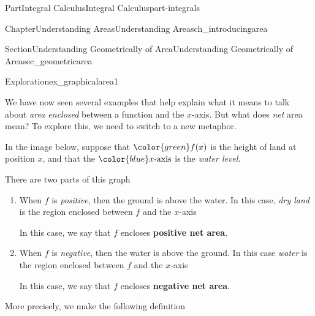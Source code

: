 \documentclass[oneside,10pt,]{tufte-book}
\newcommand{\terminology}[1]{\textbf{#1}}
\numberwithin{equation}{chapter}
\newcommand{\blue}[1]{  {\color{blue}  #1}  }
\newcommand{\green}[1]{ {\color{green} #1} }
\begin{document}
\begin{partptx}{Part}{Integral Calculus}{}{Integral Calculus}{}{}{part-integrals}
\begin{chapterptx}{Chapter}{Understanding Areas}{}{Understanding Areas}{}{}{ch_introducingarea}
\begin{sectionptx}{Section}{Understanding Geometrically of Area}{}{Understanding Geometrically of Area}{}{}{sec_geometricarea}
\begin{exploration}{Exploration}{}{ex_graphicalarea1}
\begin{enumerate}[font=\bfseries,label=(\alph*),ref=\alph*]
\begin{image}{0.25}{0.5}{0.25}{}
{
}%
\end{image}%
\end{enumerate}%
\end{exploration}%
We have now seen several examples that help explain what it means to talk about \emph{area enclosed} between a function and the \(x\)-axis. But what does \emph{net} area mean? To explore this, we need to switch to a new metaphor.%
\par
In the image below, suppose that \(\green{f(x)}\) is the height of land at position \(x\), and that the \(\blue{x\text{-axis}}\) is the \emph{water level}.%
\begin{image}{0.125}{0.75}{0.125}{}%
%
\end{image}%
There are two parts of this graph%
\begin{enumerate}
\item{}When \(f\) is \emph{positive}, then the ground is above the water.  In this case, \emph{dry land} is the region enclosed between \(f\) and the \(x\)-axis%
\par
In this case, we say that \(f\) encloses \terminology{positive net area}.%
\item{}When \(f\) is \emph{negative}, then the water is above the ground.  In this case \emph{water} is the region enclosed between \(f\) and the \(x\)-axis%
\par
In this case, we say that \(f\) encloses \terminology{negative net area}.%
\end{enumerate}
More precisely, we make the following definition%

\end{sectionptx}
\end{chapterptx}
\end{partptx}
\end{document}
